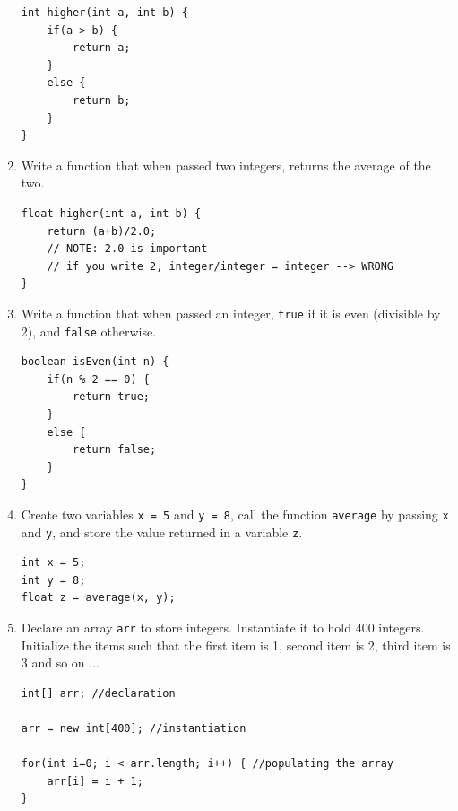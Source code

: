 \begin{questions}
\begin{enumerate}
\begin{solution}
\begin{lstlisting}
int higher(int a, int b) {
	if(a > b) {
		return a;
	}
	else {
		return b;
	}
}
\end{lstlisting}
\end{solution}

\item Write a function that when passed two integers, returns the average of the two.
\begin{solution}
\begin{lstlisting}
float higher(int a, int b) {
	return (a+b)/2.0; 
	// NOTE: 2.0 is important
	// if you write 2, integer/integer = integer --> WRONG
}
\end{lstlisting}
\end{solution}

\item Write a function that when passed an integer, \texttt{true} if it is even (divisible by 2), and \texttt{false} otherwise.
\begin{solution}
\begin{lstlisting}
boolean isEven(int n) {
	if(n % 2 == 0) {
		return true;
	}
	else {
		return false;
	}
}
\end{lstlisting}	
\end{solution}


\item Create two variables \texttt{x = 5} and \texttt{y = 8}, call the function \texttt{average} by passing \texttt{x} and \texttt{y}, and store the value returned in a variable \texttt{z}.
\begin{solution}
\begin{lstlisting}
int x = 5;
int y = 8;
float z = average(x, y);
\end{lstlisting}
\end{solution}

\item Declare an array \texttt{arr} to store integers. Instantiate it to hold 400 integers. Initialize the items such that the first item is 1, second item is 2, third item is 3 and so on ...

\begin{solution}
\begin{lstlisting}
int[] arr; //declaration

arr = new int[400]; //instantiation

for(int i=0; i < arr.length; i++) { //populating the array
	arr[i] = i + 1;
}
\end{lstlisting}
\end{solution}


\end{enumerate}
\end{questions}
